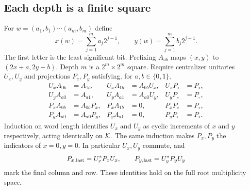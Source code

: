 \subsection{Each depth is a finite square}
For $w=(a_1,b_1)\cdots(a_m,b_m)$ define
\[
 x(w)=\sum_{j=1}^m a_j2^{j-1},\qquad
 y(w)=\sum_{j=1}^m b_j2^{j-1}.
\]
The first letter is the least significant bit. Prefixing $A_{ab}$ maps $(x,y)$ to $(2x+a,2y+b)$. Depth $m$ is a $2^m\times2^m$ square. Require centralizer unitaries $U_x,U_y$ and projections $P_x,P_y$ satisfying, for $a,b\in\{0,1\}$,
\begin{align}
 U_xA_{0b}&=A_{1b},&U_xA_{1b}&=A_{0b}U_x,&U_xP_{\circ}&=P_{\circ},\label{eq:U_x}\\
 U_yA_{a0}&=A_{a1},&U_yA_{a1}&=A_{a0}U_y,&U_yP_{\circ}&=P_{\circ},\label{eq:U_y}\\
 P_xA_{0b}&=A_{0b}P_x,&P_xA_{1b}&=0,&P_xP_{\circ}&=P_{\circ},\label{eq:P_x}\\
 P_yA_{a0}&=A_{a0}P_y,&P_yA_{a1}&=0,&P_yP_{\circ}&=P_{\circ}.\label{eq:P_y}
\end{align}
Induction on word length identifies $U_x$ and $U_y$ as cyclic increments of $x$ and $y$ respectively, acting identically on $\mathcal K$. The same induction makes $P_x,P_y$ the indicators of $x=0,y=0$. In particular $U_x,U_y$ commute, and
\[
 P_{x,\rm last}=U_x^*P_xU_x,\qquad P_{y,\rm last}=U_y^*P_yU_y
\]
mark the final column and row. These identities hold on the full root multiplicity space.

